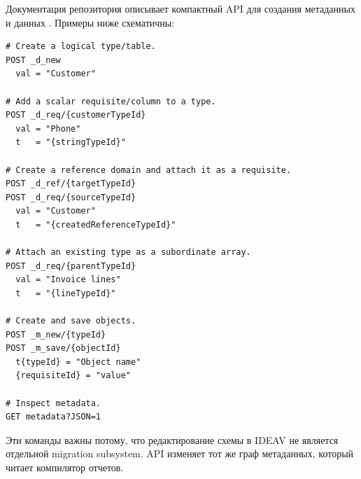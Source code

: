 \documentclass[11pt]{article}
\begin{document}
Документация репозитория описывает компактный API для создания метаданных и
данных \citep{integramMcp2026}. Примеры ниже схематичны:

\begin{verbatim}
# Create a logical type/table.
POST _d_new
  val = "Customer"

# Add a scalar requisite/column to a type.
POST _d_req/{customerTypeId}
  val = "Phone"
  t   = "{stringTypeId}"

# Create a reference domain and attach it as a requisite.
POST _d_ref/{targetTypeId}
POST _d_req/{sourceTypeId}
  val = "Customer"
  t   = "{createdReferenceTypeId}"

# Attach an existing type as a subordinate array.
POST _d_req/{parentTypeId}
  val = "Invoice lines"
  t   = "{lineTypeId}"

# Create and save objects.
POST _m_new/{typeId}
POST _m_save/{objectId}
  t{typeId} = "Object name"
  {requisiteId} = "value"

# Inspect metadata.
GET metadata?JSON=1
\end{verbatim}

Эти команды важны потому, что редактирование схемы в IDEAV не является
отдельной migration subsystem. API изменяет тот же граф метаданных, который
читает компилятор отчетов.



\end{document}
